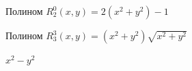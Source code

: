 \documentclass[oneside, final, 14pt]{article}
\begin{document}
\begin{figure}
\caption{Полином $R_2^0(x,y) = 2(x^2 + y^2) - 1$}
\end{figure}
\begin{figure}
\caption{Полином $R_3^3(x,y) = (x^2 + y^2)\sqrt{x^2 + y^2}$}
\end{figure}
\begin{figure}
\caption{$x^2 - y^2$}
\end{figure}
\end{document}
